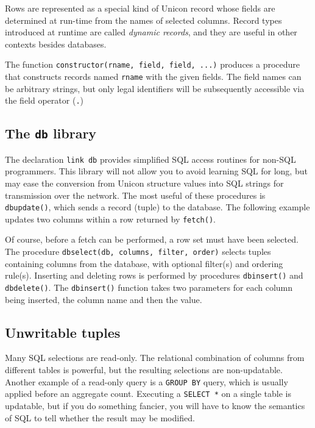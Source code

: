 Rows are represented as a special kind of Unicon record whose
fields are determined at run-time from the names
of selected columns. Record types introduced at runtime
are called \textit{dynamic records}, and they are useful in other
contexts besides databases.

The function \texttt{constructor(rname, field, field, ...)} produces a
procedure that constructs records named
\texttt{rname} with the given fields. The field names
can be arbitrary strings, but only legal identifiers
will be subsequently accessible via the field operator (\texttt{.})

\subsection{The \texttt{db} library}

The declaration \texttt{link db} provides simplified SQL access routines
for non-SQL programmers.
This library will not allow you to avoid learning SQL for long,
but may ease the conversion from Unicon structure values into SQL
strings for transmission over the network.
The most useful of these procedures is \texttt{dbupdate()}, which sends
a record (tuple) to the database. The following example updates two
columns within a row returned by \texttt{fetch()}.


Of course, before a fetch can be performed, a row set must have been
selected. The procedure \texttt{dbselect(db, columns, filter, order)}
selects tuples containing columns from the database, with optional
filter(s) and ordering rule(s).
Inserting and deleting rows is performed by procedures
\texttt{dbinsert()} and \texttt{dbdelete()}. The \texttt{dbinsert()}
function takes two parameters for each column being inserted, the
column name and then the value.

\subsection{Unwritable tuples}

Many SQL selections are read-only.  The relational combination of
columns from different tables is powerful, but the resulting
selections are non-updatable.  Another example of a read-only query is
a \texttt{GROUP BY} query, which is usually applied before an
aggregate count. Executing a \texttt{SELECT *} on a single table is
updatable, but if you do something fancier, you will have to know the
semantics of SQL to tell whether the result may be modified.

